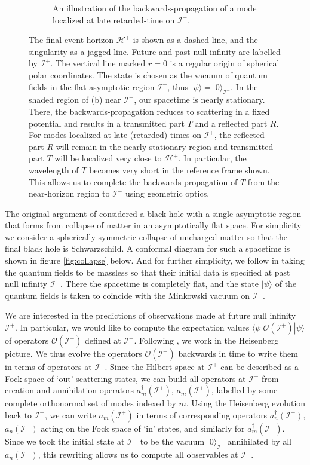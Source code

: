 \documentclass[letterpaper,12pt]{article}
\newcommand*{\scri}{\mathscr{I}} %
\begin{document}
\begin{figure}
\begin{subfigure}[t]{.4\textwidth}
		\caption{ An illustration of the backwards-propagation of a mode localized at late retarded-time on $\scri^+$.\label{fig:propagate}}
\end{subfigure}
\caption{The final event horizon $\mathcal{H}^+$ is shown as a dashed line, and the singularity as a jagged line.  Future and past null infinity are labelled by $\scri^\pm$. The vertical line marked $r=0$ is a regular origin of spherical polar coordinates. The state is chosen as the vacuum of quantum fields in the flat asymptotic region $\scri^-$, thus $|\psi\rangle  = |0\rangle_{\scri^-}$. In the shaded region of (b) near $\scri^+$, our spacetime is nearly stationary.   There, the backwards-propagation reduces to scattering in a fixed potential and results in a transmitted part $T$ and a reflected part $R$.  For modes localized at late (retarded) times on $\scri^+$, the reflected part $R$ will remain in the nearly stationary region and transmitted part $T$ will be localized very close to $\mathcal{H}^+$.  In particular, the wavelength of $T$ becomes very short in the reference frame shown.   This allows us to complete the backwards-propagation of $T$ from the near-horizon region to $\scri^-$ using geometric optics.}
\end{figure}

The original argument of \cite{Hawking:1974sw} considered a black hole with a single asymptotic region that forms from collapse of matter in an asymptotically flat space. For simplicity we consider a spherically symmetric collapse of uncharged matter so that the final black hole is Schwarzschild.   A conformal diagram for such a spacetime is shown in figure \ref{fig:collapse} below.  And for further simplicity, we follow \cite{Hawking:1974sw} in taking the quantum fields to be massless so that their initial data is specified at past null infinity $\scri^-$.  There the spacetime is completely flat, and the state $|\psi\rangle$ of the quantum fields is taken to coincide with the Minkowski vacuum on $\scri^-$.


We are interested in the predictions of observations made at future null infinity $\scri^+$. In particular, we would like to compute the expectation values $\langle\psi|\mathcal{O}(\scri^+)|\psi\rangle$ of operators $\mathcal{O}(\scri^+)$ defined at $\scri^+$. Following \cite{Hawking:1974sw}, we work in the Heisenberg picture. We thus evolve the operators $\mathcal{O}(\scri^+)$ backwards in time to write them in terms of operators at $\scri^-$.
Since the Hilbert space at $\scri^+$ can be described as a Fock space of  `out' scattering states, we can build all operators at $\scri^+$ from creation and annihilation operators $a_m^\dagger(\scri^+)$, $a_m(\scri^+)$, labelled by some complete orthonormal set of modes indexed by $m$. Using the Heisenberg evolution back to $\scri^-$, we can write $a_m(\scri^+)$ in terms of corresponding operators $a_n^\dagger(\scri^-)$, $a_n(\scri^-)$ acting on the Fock space of `in' states, and similarly for $a_m^\dagger(\scri^+)$. Since we took the initial state at $\scri^-$ to be the vacuum $|0\rangle_{\scri^-}$ annihilated by all $a_n(\scri^-)$, this rewriting allows us to compute all observables at $\scri^+$.
\end{document}
